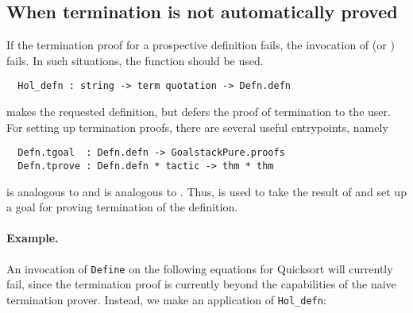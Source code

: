 \subsection{When termination is not automatically proved}

If the termination proof for a prospective definition
fails, the invocation of  (or ) fails. In such
situations, the \ML{} function  should be used.
%

\begin{hol}
\begin{verbatim}
  Hol_defn : string -> term quotation -> Defn.defn
\end{verbatim}
\end{hol}

 makes the requested definition, but defers the proof of
termination to the user. For setting up termination proofs, there are
several useful entrypoints, namely
\begin{hol}
\begin{verbatim}
  Defn.tgoal  : Defn.defn -> GoalstackPure.proofs
  Defn.tprove : Defn.defn * tactic -> thm * thm
\end{verbatim}
\end{hol}
 is analogous to  and  is
analogous to . Thus,  is used to take the
result of  and set up a goal for proving termination
of the definition.

\paragraph{Example.} An invocation of {\small\verb+Define+} on
the following equations for Quicksort will currently fail, since the
termination proof is currently beyond the capabilities of the naive termination
prover. Instead, we make an application of {\small\verb+Hol_defn+}:

